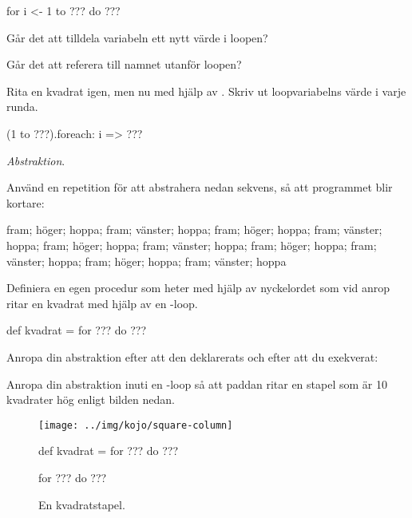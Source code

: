 \begin{Code}
for i <- 1 to ??? do
  ???
\end{Code}

\Subtask\Pen Går det att tilldela variabeln  ett nytt värde i loopen?

\Subtask\Pen Går det att referera till namnet  utanför loopen?


\Subtask Rita en kvadrat igen, men nu med hjälp av . Skriv ut loopvariabelns värde i varje runda.

\begin{Code}
(1 to ???).foreach: i =>
  ???
\end{Code}



\Task \textit{Abstraktion}.

\Subtask Använd en repetition för att abstrahera nedan sekvens, så att programmet blir kortare:
\begin{Code}
fram; höger; hoppa; fram; vänster; hoppa; fram; höger;
hoppa; fram; vänster; hoppa; fram; höger; hoppa; fram;
vänster; hoppa; fram; höger; hoppa; fram; vänster; hoppa;
fram; höger; hoppa; fram; vänster; hoppa
\end{Code}


\Subtask Definiera en egen procedur som heter  med hjälp av nyckelordet  som vid anrop ritar en kvadrat med hjälp av en -loop.

\begin{Code}
def kvadrat =
  for ??? do
    ???
\end{Code}


\Subtask Anropa din abstraktion efter att den deklarerats och efter att du exekverat:\\


\Subtask Anropa din abstraktion inuti en -loop så att paddan ritar en stapel som är 10 kvadrater hög enligt bilden nedan.

\begin{figure}
  \begin{multicols}{2}

  \texttt{[image: ../img/kojo/square-column]}

  \columnbreak

  \begin{Code}
  def kvadrat =
    for ??? do
      ???

  for ??? do
    ???
  \end{Code}

  \end{multicols}
  \caption{En kvadratstapel.\label{fig:kojo-lab:column}}
\end{figure}

